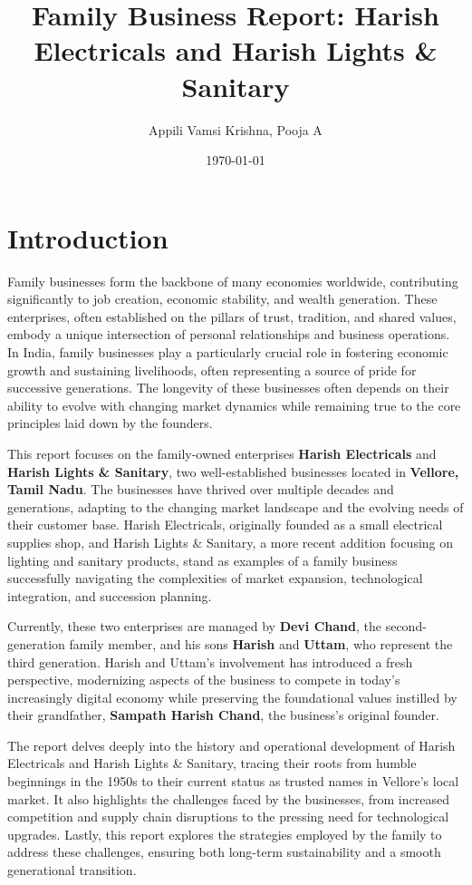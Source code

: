 \documentclass[a4paper,12pt]{report}
\title{Family Business Report: Harish Electricals and Harish Lights \& Sanitary}
\author{Appili Vamsi Krishna, Pooja A}
\date{\today}
\begin{document}
\maketitle

\tableofcontents
\newpage

\chapter{Introduction}

Family businesses form the backbone of many economies worldwide, contributing significantly to job creation, economic stability, and wealth generation. These enterprises, often established on the pillars of trust, tradition, and shared values, embody a unique intersection of personal relationships and business operations. In India, family businesses play a particularly crucial role in fostering economic growth and sustaining livelihoods, often representing a source of pride for successive generations. The longevity of these businesses often depends on their ability to evolve with changing market dynamics while remaining true to the core principles laid down by the founders.

This report focuses on the family-owned enterprises \textbf{Harish Electricals} and \textbf{Harish Lights \& Sanitary}, two well-established businesses located in \textbf{Vellore, Tamil Nadu}. The businesses have thrived over multiple decades and generations, adapting to the changing market landscape and the evolving needs of their customer base. Harish Electricals, originally founded as a small electrical supplies shop, and Harish Lights \& Sanitary, a more recent addition focusing on lighting and sanitary products, stand as examples of a family business successfully navigating the complexities of market expansion, technological integration, and succession planning.

Currently, these two enterprises are managed by \textbf{Devi Chand}, the second-generation family member, and his sons \textbf{Harish} and \textbf{Uttam}, who represent the third generation. Harish and Uttam’s involvement has introduced a fresh perspective, modernizing aspects of the business to compete in today's increasingly digital economy while preserving the foundational values instilled by their grandfather, \textbf{Sampath Harish Chand}, the business's original founder.

The report delves deeply into the history and operational development of Harish Electricals and Harish Lights \& Sanitary, tracing their roots from humble beginnings in the 1950s to their current status as trusted names in Vellore's local market. It also highlights the challenges faced by the businesses, from increased competition and supply chain disruptions to the pressing need for technological upgrades. Lastly, this report explores the strategies employed by the family to address these challenges, ensuring both long-term sustainability and a smooth generational transition.
\end{document}
